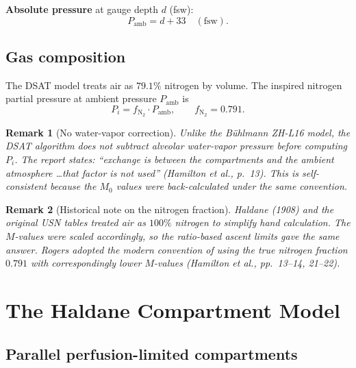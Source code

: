 \documentclass[11pt,letterpaper]{article}
\newtheorem{remark}{Remark}
\begin{document}
\textbf{Absolute pressure} at gauge depth $d$ (fsw):
\begin{equation}
  P_{\mathrm{amb}} = d + 33 \quad (\text{fsw}).
  \label{eq:pamb}
\end{equation}

\subsection{Gas composition}

The DSAT model treats air as $79.1\%$ nitrogen by volume.  The inspired
nitrogen partial pressure at ambient pressure $P_{\mathrm{amb}}$ is
\begin{equation}
  P_i = f_{\mathrm{N}_2} \cdot P_{\mathrm{amb}},
  \qquad f_{\mathrm{N}_2} = 0.791.
  \label{eq:pi}
\end{equation}

\begin{remark}[No water-vapor correction]
Unlike the B\"uhlmann ZH-L16 model, the DSAT algorithm does \emph{not}
subtract alveolar water-vapor pressure before computing $P_i$.  The report
states: ``exchange is between the compartments and the ambient atmosphere
\ldots that factor is not used'' (Hamilton et al., p.~13).  This is
self-consistent because the $M_0$ values were back-calculated under the
same convention.
\end{remark}

\begin{remark}[Historical note on the nitrogen fraction]
Haldane (1908) and the original USN tables treated air as $100\%$ nitrogen
to simplify hand calculation.  The $M$-values were scaled accordingly, so
the ratio-based ascent limits gave the same answer.  Rogers adopted the
modern convention of using the true nitrogen fraction $0.791$ with
correspondingly lower $M$-values (Hamilton et al., pp.~13--14, 21--22).
\end{remark}


\section{The Haldane Compartment Model}

\subsection{Parallel perfusion-limited compartments}
\end{document}
